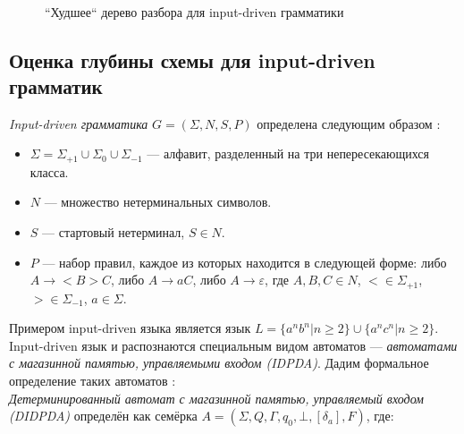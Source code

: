 \documentclass{spbau-diploma}
\begin{document}
\begin{figure}
\centering

 \\
	\caption{``Худшее`` дерево разбора для input-driven грамматики}
\label{Linw}
\end{figure}
\subsection{Оценка глубины схемы для input-driven грамматик}
\textit{Input-driven грамматика} $G = ( \Sigma, N, S, P)$ определена следующим образом \cite{IDGrammar}:
\begin{itemize}
	\item $\Sigma = \Sigma_{+1} \cup \Sigma_0 \cup \Sigma_{-1}$ --- алфавит, разделенный на три непересекающихся класса.
	\item $N$ --- множество нетерминальных символов.
         \item $S$ --- стартовый нетерминал, $S \in N$.
	\item $P$ --- набор правил, каждое из которых находится в следующей форме: либо $A \rightarrow <B>C$, либо $A \rightarrow aC$, либо $A \rightarrow \varepsilon$,  где $A, B, C \in N$,  $< \in \Sigma_{+1}$, $> \in  \Sigma_{-1}$, $a \in \Sigma$.
\end{itemize}
Примером input-driven языка является язык $L = \{a^nb^n | n \ge 2\} \cup \{a^nc^n | n \ge 2\}$.
\\Input-driven язык и распознаются специальным видом автоматов --- \textit{автоматами с магазинной памятью, управляемыми входом (IDPDA)}. Дадим формальное определение таких автоматов \cite{OkhotinIDPDA}:
\\
\textit{Детерминированный автомат с магазинной памятью, управляемый входом (DIDPDA)} определён как семёрка $A = (\Sigma, Q, \Gamma, q_0, \bot, [\delta_a], F)$, где: 
\end{document}
